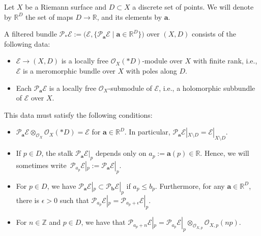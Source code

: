 \documentclass[11pt]{article}
\numberwithin{equation}{section}
\numberwithin{equation}{section}
\begin{document}
Let $X$ be a Riemann surface and $D\subset X$ a discrete set of points. We will denote by $\mathbb{R}^D$ the set of maps $D\to \mathbb{R}$, and its elements by $\boldsymbol{a}$.
\begin{Definition} \label{deffilt} A filtered bundle $\mathcal{P}_*\mathcal{E}:=\bigl(\mathcal{E},\bigl\{\mathcal{P}_{\boldsymbol{a}}\mathcal{E} \mid \boldsymbol{a}\in \mathbb{R}^{D} \bigr\}\bigr)$ over $(X,D)$ consists of the following data:
\begin{itemize}\itemsep=0pt
 \item $\mathcal{E}\to (X,D)$ is a locally free $\mathcal{O}_{X}(*D)$-module over $X$ with finite rank, i.e., $\mathcal{E}$ is a meromorphic bundle over $X$ with poles along $D$.
 \item Each $\mathcal{P}_{\boldsymbol{a}}\mathcal{E}$ is a locally free $\mathcal{O}_{X}$-submodule of $\mathcal{E}$, i.e., a holomorphic subbundle of $\mathcal{E}$ over $X$.
\end{itemize}
This data must satisfy the following conditions:
\begin{itemize}\itemsep=0pt
 \item $\mathcal{P}_{\boldsymbol{a}}\mathcal{E}\otimes_{\mathcal{O}_X}\mathcal{O}_{X}(*D)=\mathcal{E}$ for $\boldsymbol{a}\in \mathbb{R}^D$. In particular, $\mathcal{P}_{\boldsymbol{a}}\mathcal{E}|_{X\setminus D}=\mathcal{E}|_{X\setminus D}$.
 \item If $p\in D$, the stalk $\mathcal{P}_{\boldsymbol{a}}\mathcal{E}|_p$ depends only on $a_p:=\boldsymbol{a}(p)\in \mathbb{R}$. Hence, we will sometimes write~${\mathcal{P}_{a_p}\mathcal{E}|_p:=\mathcal{P}_{\boldsymbol{a}}\mathcal{E}|_p}$.
 \item For $p \in D$, we have $\mathcal{P}_{\boldsymbol{a}}\mathcal{E}|_p\subset \mathcal{P}_{\boldsymbol{b}}\mathcal{E}|_p$ if $a_p\leq b_p$. Furthermore, for any $\boldsymbol{a} \in \mathbb{R}^D$, there is $\epsilon>0$ such that $\mathcal{P}_{a_p}\mathcal{E}|_p=\mathcal{P}_{a_p+\epsilon}\mathcal{E}|_p$.
 \item For $n \in \mathbb{Z}$ and $p \in D$, we have that $\mathcal{P}_{a_p+n}\mathcal{E}|_p=\mathcal{P}_{a_p}\mathcal{E}|_p\otimes_{\mathcal{O}_{X,p}} \mathcal{O}_{X,p}(np)$.
\end{itemize}
\end{Definition}
\end{document}
